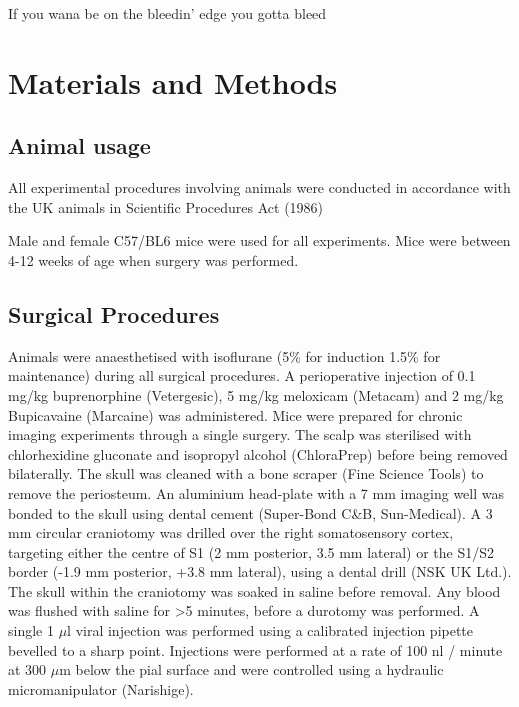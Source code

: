 \begin{savequote}[8cm]

If you wana be on the bleedin' edge you gotta bleed 
\end{savequote}

\chapter{\label{ch:2-Materials and Methods}Materials and Methods} 

\minitoc

\section{Animal usage}

All experimental procedures involving animals were conducted in accordance with the UK animals in Scientific Procedures Act (1986) \cite{packer_simultaneous_2015}

Male and female C57/BL6 mice were used for all experiments. Mice were between 4-12 weeks of age when surgery was performed.

\section{Surgical Procedures}
Animals were anaesthetised with isoflurane (5\% for induction 1.5\% for maintenance) during all surgical procedures. A perioperative injection of 0.1 mg/kg buprenorphine (Vetergesic), 5 mg/kg meloxicam (Metacam) and 2 mg/kg Bupicavaine (Marcaine) was administered. Mice were prepared for chronic imaging experiments through a single surgery. 
The scalp was sterilised with chlorhexidine gluconate and isopropyl alcohol (ChloraPrep) before being removed bilaterally. The skull was cleaned with a bone scraper (Fine Science Tools) to remove the periosteum. An aluminium head-plate with a 7 mm imaging well was bonded
to the skull using dental cement (Super-Bond C&B, Sun-Medical). A 3 mm circular craniotomy was drilled over the right somatosensory cortex, targeting either the centre of S1 (2 mm posterior, 3.5 mm lateral) or the S1/S2 border (-1.9 mm posterior, +3.8 mm lateral), using a dental drill (NSK UK Ltd.). The skull within the craniotomy was soaked in saline before removal. 
Any blood was flushed with saline for >5 minutes, before a durotomy was performed. A single 1 $\mu$l
viral injection was performed using a calibrated injection pipette bevelled to a sharp point.
Injections were performed at a rate of 100 nl / minute at 300 $\mu$m below the pial surface and were controlled using a hydraulic micromanipulator (Narishige). 

